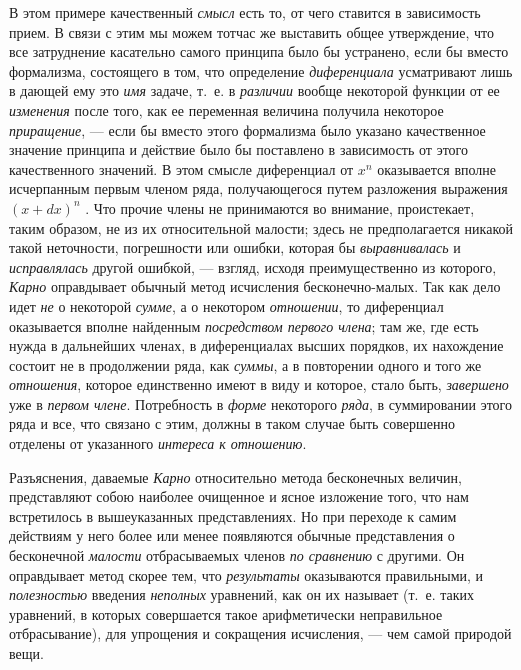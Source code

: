 {В этом примере качественный {\em смысл} есть то, от чего
ставится в зависимость прием. В связи с этим мы можем тотчас же выставить
общее утверждение, что все затруднение касательно самого принципа было бы
устранено, если бы вместо формализма, состоящего в том, что определение
{\em диференциала} усматривают лишь в дающей ему это
{\em имя} задаче, т.~е. в
{\em различии} вообще некоторой функции от ее
{\em изменения} после того, как ее переменная величина
получила некоторое {\em приращение}, — если бы вместо
этого формализма было указано качественное значение принципа и действие
было бы поставлено в зависимость от этого качественного значений. В этом
смысле диференциал от  $x^n$  оказывается вполне исчерпанным первым членом
ряда, получающегося путем разложения выражения  $(x+\mathit{dx})^n$ . Что
прочие члены не принимаются во внимание, проистекает, таким образом, не из
их относительной малости; здесь не предполагается никакой такой неточности,
погрешности или ошибки, которая бы {\em выравнивалась}
и {\em исправлялась} другой ошибкой, — взгляд, исходя
преимущественно из которого, {\em Карно} оправдывает
обычный метод исчисления бесконечно-малых. Так как дело идет
{\em не} о некоторой {\em сумме}, а
о некотором {\em отношении}, то диференциал оказывается
вполне найденным {\em посредством первого члена}; там
же, где есть нужда в дальнейших членах, в диференциалах высших порядков, их
нахождение состоит не в продолжении ряда, как
{\em суммы}, а в повторении одного и того же
{\em отношения}, которое единственно имеют в виду и
которое, стало быть, {\em завершено} уже в
{\em первом члене}. Потребность в
{\em форме} некоторого {\em ряда},
в суммировании этого ряда и все, что связано с этим, должны в таком случае
быть совершенно отделены от указанного {\em интереса к
отношению}.

Разъяснения, даваемые {\em Карно} относительно метода
бесконечных величин, представляют собою наиболее очищенное и ясное
изложение того, что нам встретилось в вышеуказанных представлениях. Но при
переходе к самим действиям у него более или менее появляются обычные
представления о бесконечной {\em малости} отбрасываемых
членов {\em по сравнению} с другими. Он оправдывает
метод скорее тем, что {\em результаты} оказываются
правильными, и {\em полезностью} введения
{\em неполных} уравнений, как он их называет (т.~е.
таких уравнений, в которых совершается такое арифметически неправильное
отбрасывание), для упрощения и сокращения исчисления, — чем самой природой
вещи.

}
